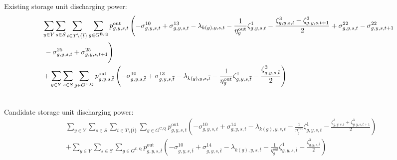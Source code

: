 \documentclass{article}
\newcommand{\sStorageExisting}{G^{\mathrm{E,Q}}}
\newcommand{\sStorageCandidate}{G^{\mathrm{C,Q}}}
\newcommand{\sYears}{Y}
\newcommand{\sScenarios}{S}
\newcommand{\sIntervals}{T}
\newcommand{\iGenerator}{g}
\newcommand{\iYear}{y}
\newcommand{\iScenario}{s}
\newcommand{\iInterval}{t}
\newcommand{\iIntervalTerminal}{\overline{\iInterval}}
\newcommand{\iZone}{z}
\newcommand{\cStorageUnitEfficiencyDischarging}{\eta_{\iGenerator}^{\mathrm{out}}}
\newcommand{\vPowerOut}[1][\iGenerator,\iYear,\iScenario,\iInterval]{p^{\mathrm{out}}_{#1}}
\newcommand{\dNonNegativeDischarging}[1][\iGenerator,\iYear,\iScenario,\iInterval]{\sigma_{#1}^{10}}
\newcommand{\dMaxDischargingRateExisting}[1][\iGenerator,\iYear,\iScenario,\iInterval]{\sigma_{#1}^{13}}
\newcommand{\dMaxDischargingRateCandidate}[1][\iGenerator,\iYear,\iScenario,\iInterval]{\sigma_{#1}^{14}}
\newcommand{\dRampRateUpStorageDischarging}[1][\iGenerator,\iYear,\iScenario,\iInterval]{\sigma_{#1}^{22}}
\newcommand{\dRampRateDownStorageDischarging}[1][\iGenerator,\iYear,\iScenario,\iInterval]{\sigma_{#1}^{25}}
\newcommand{\dPowerBalance}[1][\iZone,\iYear,\iScenario,\iInterval]{\lambda_{#1}}
\newcommand{\dStorageEnergyTransition}[1][\iGenerator,\iYear,\iScenario,\iInterval]{\zeta_{#1}^{1}}
\newcommand{\dStorageEnergyOutput}[1][\iGenerator,\iYear,\iScenario,\iInterval]{\zeta_{#1}^{3}}
\begin{document}
Existing storage unit discharging power:
\begin{align}
	& \sum\limits_{\iYear \in \sYears}\sum\limits_{\iScenario \in \sScenarios}\sum\limits_{\iInterval \in \sIntervals \setminus \{\iIntervalTerminal\}} \sum\limits_{\iGenerator \in \sStorageExisting} \vPowerOut \left( - \dNonNegativeDischarging + \dMaxDischargingRateExisting - \dPowerBalance[k(\iGenerator),\iYear,\iScenario,\iInterval] - \frac{1}{\cStorageUnitEfficiencyDischarging} \dStorageEnergyTransition - \frac{\dStorageEnergyOutput + \dStorageEnergyOutput[\iGenerator,\iYear,\iScenario,\iInterval+1]}{2} + \dRampRateUpStorageDischarging - \dRampRateUpStorageDischarging[\iGenerator,\iYear,\iScenario,\iInterval+1]   \right.\nonumber\\
	& \left. \vphantom{\sum\limits_{}} - \dRampRateDownStorageDischarging + \dRampRateDownStorageDischarging[\iGenerator,\iYear,\iScenario,\iInterval+1] \right)\\
	& + \sum\limits_{\iYear \in \sYears}\sum\limits_{\iScenario \in \sScenarios} \sum\limits_{\iGenerator \in \sStorageExisting} \vPowerOut[\iGenerator,\iYear,\iScenario,\iIntervalTerminal] \left( - \dNonNegativeDischarging[\iGenerator,\iYear,\iScenario,\iIntervalTerminal] + \dMaxDischargingRateExisting[\iGenerator,\iYear,\iScenario,\iIntervalTerminal] - \dPowerBalance[k(\iGenerator),\iYear,\iScenario,\iIntervalTerminal] - \frac{1}{\cStorageUnitEfficiencyDischarging} \dStorageEnergyTransition[\iGenerator,\iYear,\iScenario,\iIntervalTerminal] - \frac{\dStorageEnergyOutput[\iGenerator,\iYear,\iScenario,\iIntervalTerminal]}{2}\right)\\\nonumber
\end{align}

Candidate storage unit discharging power:
\begin{align}
	& \sum\limits_{\iYear \in \sYears}\sum\limits_{\iScenario \in \sScenarios} \sum\limits_{\iInterval \in \sIntervals \setminus \{\iIntervalTerminal\}} \sum\limits_{\iGenerator \in \sStorageCandidate} \vPowerOut \left( - \dNonNegativeDischarging + \dMaxDischargingRateCandidate - \dPowerBalance[k(\iGenerator),\iYear,\iScenario,\iInterval] - \frac{1}{\cStorageUnitEfficiencyDischarging} \dStorageEnergyTransition - \frac{\dStorageEnergyOutput + \dStorageEnergyOutput[\iGenerator,\iYear,\iScenario,\iInterval+1]}{2}\right) \nonumber\\
	& + \sum\limits_{\iYear \in \sYears}\sum\limits_{\iScenario \in \sScenarios} \sum\limits_{\iGenerator \in \sStorageCandidate} \vPowerOut[\iGenerator,\iYear,\iScenario,\iIntervalTerminal] \left( - \dNonNegativeDischarging[\iGenerator,\iYear,\iScenario,\iIntervalTerminal] + \dMaxDischargingRateCandidate[\iGenerator,\iYear,\iScenario,\iIntervalTerminal] - \dPowerBalance[k(\iGenerator),\iYear,\iScenario,\iIntervalTerminal] - \frac{1}{\cStorageUnitEfficiencyDischarging} \dStorageEnergyTransition[\iGenerator,\iYear,\iScenario,\iIntervalTerminal] - \frac{\dStorageEnergyOutput[\iGenerator,\iYear,\iScenario,\iIntervalTerminal]}{2}\right)\\\nonumber
\end{align}
\end{document}
